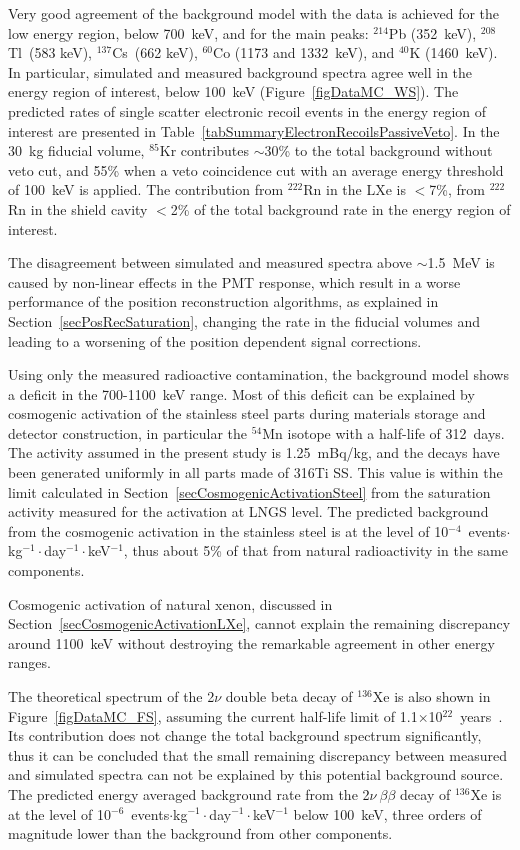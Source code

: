 Very good agreement of the background model with the data is achieved for the low energy region, below 700~keV, and for the main peaks: $^{214}$Pb (352~keV), $^{208}$Tl~(583 keV), $^{137}$Cs~(662 keV), $^{60}$Co (1173 and 1332~keV), and $^{40}$K (1460~keV). In particular, simulated and measured background spectra agree well in the energy region of interest, below 100~keV (Figure~\ref{figDataMC_WS}). The predicted rates of single scatter electronic recoil events in the energy region of interest are presented in Table~\ref{tabSummaryElectronRecoilsPassiveVeto}. In the 30~kg fiducial volume, $^{85}$Kr contributes $\sim$30\% to the total background without veto cut, and 55\% when a veto coincidence cut with an average energy threshold of 100~keV is applied. The contribution from $^{222}$Rn in the LXe is $<$7\%, from $^{222}$Rn in the shield cavity $<$2\% of the total background rate in the energy region of interest.

The disagreement between simulated and measured spectra above $\sim$1.5~MeV is caused by  non-linear effects in the PMT response, which result in a worse performance of the position reconstruction algorithms, as explained in Section~\ref{secPosRecSaturation}, changing the rate in the fiducial volumes and leading to a worsening of the position dependent signal corrections. 

Using only the measured radioactive contamination, the background model shows a deficit in the 700-1100~keV range. Most of this deficit can be explained by cosmogenic activation of the stainless steel parts during materials storage and detector construction, in particular the $^{54}$Mn isotope with a half-life of 312~days. The activity assumed in the present study is 1.25~mBq/kg, and the decays have been generated uniformly in all parts made of 316Ti SS. This value is within the limit calculated in Section~\ref{secCosmogenicActivationSteel} from the saturation activity measured for the activation at LNGS level. The predicted background from the cosmogenic activation in the stainless steel is at the level of 10$^{-4}$~events$\cdot$kg$^{-1}\cdot$day$^{-1}\cdot$keV$^{-1}$, thus about 5\% of that from natural radioactivity in the same components.

Cosmogenic activation of natural xenon, discussed in Section~\ref{secCosmogenicActivationLXe}, cannot explain the remaining discrepancy around 1100~keV without destroying the remarkable agreement in other energy ranges. 

The theoretical spectrum of the 2$\nu$ double beta decay of $^{136}$Xe is also shown in Figure~\ref{figDataMC_FS},  assuming the current half-life limit of 1.1$\times$10$^{22}$~years~\cite{DoubleBetaLimit}. Its contribution does not change the total background spectrum significantly, thus it can be concluded that the small remaining discrepancy between measured and simulated spectra can not be explained by this potential background source. The predicted energy averaged background rate from the 2$\nu~\beta\beta$ decay of $^{136}$Xe is at the level of 10$^{-6}$~events$\cdot$kg$^{-1}\cdot$day$^{-1}\cdot$keV$^{-1}$ below 100~keV, three orders of magnitude lower than the background from other components. 

